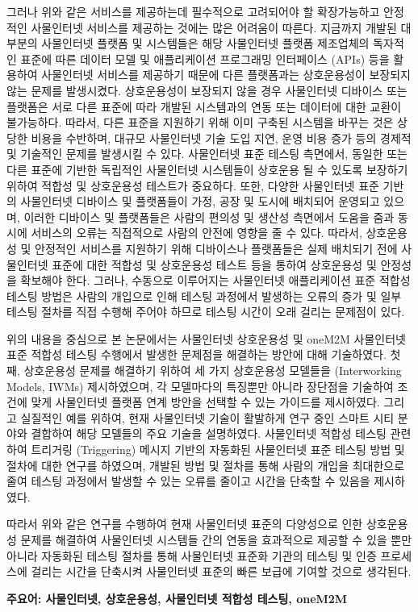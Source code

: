 그러나 위와 같은 서비스를 제공하는데 필수적으로 고려되어야 할 확장가능하고 안정적인 사물인터넷 서비스를 제공하는 것에는 많은 어려움이 따른다. 지금까지 개발된 대부분의 사물인터넷 플랫폼 및 시스템들은 해당 사물인터넷 플랫폼 제조업체의 독자적인 표준에 따른 데이터 모델 및 애플리케이션 프로그래밍 인터페이스 (APIs) 등을 활용하여 사물인터넷 서비스를 제공하기 때문에 다른 플랫폼과는 상호운용성이 보장되지 않는 문제를 발생시켰다. 상호운용성이 보장되지 않을 경우 사물인터넷 디바이스 또는 플랫폼은 서로 다른 표준에 따라 개발된 시스템과의 연동 또는 데이터에 대한 교환이 불가능하다. 따라서, 다른 표준을 지원하기 위해 이미 구축된 시스템을 바꾸는 것은 상당한 비용을 수반하며, 대규모 사물인터넷 기술 도입 지연, 운영 비용 증가 등의 경제적 및 기술적인 문제를 발생시킬 수 있다. 사물인터넷 표준 테스팅 측면에서, 동일한 또는 다른 표준에 기반한 독립적인 사물인터넷 시스템들이 상호운용 될 수 있도록 보장하기 위하여 적합성 및 상호운용성 테스트가 중요하다. 또한, 다양한 사물인터넷 표준 기반의 사물인터넷 디바이스 및 플랫폼들이 가정, 공장 및 도시에 배치되어 운영되고 있으며, 이러한 디바이스 및 플랫폼들은 사람의 편의성 및 생산성 측면에서 도움을 줌과 동시에 서비스의 오류는 직접적으로 사람의 안전에 영향을 줄 수 있다. 따라서, 상호운용성 및 안정적인 서비스를 지원하기 위해 디바이스나 플랫폼들은 실제 배치되기 전에 사물인터넷 표준에 대한 적합성 및 상호운용성 테스트 등을 통하여 상호운용성 및 안정성을 확보해야 한다. 그러나, 수동으로 이루어지는 사물인터넷 애플리케이션 표준 적합성 테스팅 방법은 사람의 개입으로 인해 테스팅 과정에서 발생하는 오류의 증가 및 일부 테스팅 절차를 직접 수행해 주어야 하므로 테스팅 시간이 오래 걸리는 문제점이 있다.

위의 내용을 중심으로 본 논문에서는 사물인터넷 상호운용성 및 oneM2M 사물인터넷 표준 적합성 테스팅 수행에서 발생한 문제점을 해결하는 방안에 대해 기술하였다. 첫째, 상호운용성 문제를 해결하기 위하여 세 가지 상호운용성 모델들을 (Interworking Models, IWMs) 제시하였으며, 각 모델마다의 특징뿐만 아니라 장단점을 기술하여 조건에 맞게 사물인터넷 플랫폼 연계 방안을 선택할 수 있는 가이드를 제시하였다. 그리고 실질적인 예를 위하여, 현재 사물인터넷 기술이 활발하게 연구 중인 스마트 시티 분야와 결합하여 해당 모델들의 주요 기술을 설명하였다. 사물인터넷 적합성 테스팅 관련하여 트리거링 (Triggering) 메시지 기반의 자동화된 사물인터넷 표준 테스팅 방법 및 절차에 대한 연구를 하였으며, 개발된 방법 및 절차를 통해 사람의 개입을 최대한으로 줄여 테스팅 과정에서 발생할 수 있는 오류를 줄이고 시간을 단축할 수 있음을 제시하였다. 

따라서 위와 같은 연구를 수행하여 현재 사물인터넷 표준의 다양성으로 인한 상호운용성 문제를 해결하여 사물인터넷 시스템들 간의 연동을 효과적으로 제공할 수 있을 뿐만 아니라 자동화된 테스팅 절차를 통해 사물인터넷 표준화 기관의 테스팅 및 인증 프로세스에 걸리는 시간을 단축시켜 사물인터넷 표준의 빠른 보급에 기여할 것으로 생각된다. 

\begin{flushleft}
\textbf{주요어: 사물인터넷, 상호운용성, 사물인터넷 적합성 테스팅, oneM2M}
\end{flushleft}

\clearpage